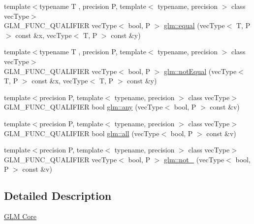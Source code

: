 \begin{DoxyCompactItemize}
\item 
{\footnotesize template$<$typename T , precision P, template$<$ typename, precision $>$ class vec\+Type$>$ }\\G\+L\+M\+\_\+\+F\+U\+N\+C\+\_\+\+Q\+U\+A\+L\+I\+F\+I\+ER vec\+Type$<$ bool, P $>$ \hyperlink{group__core__func__vector__relational_ga39c80d8baf49b0ce69f2bb22d45b3801}{glm\+::equal} (vec\+Type$<$ T, P $>$ const \&x, vec\+Type$<$ T, P $>$ const \&y)
\item 
{\footnotesize template$<$typename T , precision P, template$<$ typename, precision $>$ class vec\+Type$>$ }\\G\+L\+M\+\_\+\+F\+U\+N\+C\+\_\+\+Q\+U\+A\+L\+I\+F\+I\+ER vec\+Type$<$ bool, P $>$ \hyperlink{group__core__func__vector__relational_ga5aca2b745e5eb0096716bbc394846309}{glm\+::not\+Equal} (vec\+Type$<$ T, P $>$ const \&x, vec\+Type$<$ T, P $>$ const \&y)
\item 
{\footnotesize template$<$precision P, template$<$ typename, precision $>$ class vec\+Type$>$ }\\G\+L\+M\+\_\+\+F\+U\+N\+C\+\_\+\+Q\+U\+A\+L\+I\+F\+I\+ER bool \hyperlink{group__core__func__vector__relational_ga632a2644532d9332011c8860400d30b2}{glm\+::any} (vec\+Type$<$ bool, P $>$ const \&v)
\item 
{\footnotesize template$<$precision P, template$<$ typename, precision $>$ class vec\+Type$>$ }\\G\+L\+M\+\_\+\+F\+U\+N\+C\+\_\+\+Q\+U\+A\+L\+I\+F\+I\+ER bool \hyperlink{group__core__func__vector__relational_ga14bbc94f2ae2774a1d64d91f8767773e}{glm\+::all} (vec\+Type$<$ bool, P $>$ const \&v)
\item 
{\footnotesize template$<$precision P, template$<$ typename, precision $>$ class vec\+Type$>$ }\\G\+L\+M\+\_\+\+F\+U\+N\+C\+\_\+\+Q\+U\+A\+L\+I\+F\+I\+ER vec\+Type$<$ bool, P $>$ \hyperlink{group__core__func__vector__relational_ga4329ecbc2ef012c9ec704bd09da1f177}{glm\+::not\+\_\+} (vec\+Type$<$ bool, P $>$ const \&v)
\end{DoxyCompactItemize}


\subsection{Detailed Description}
\hyperlink{group__core}{G\+LM Core} 